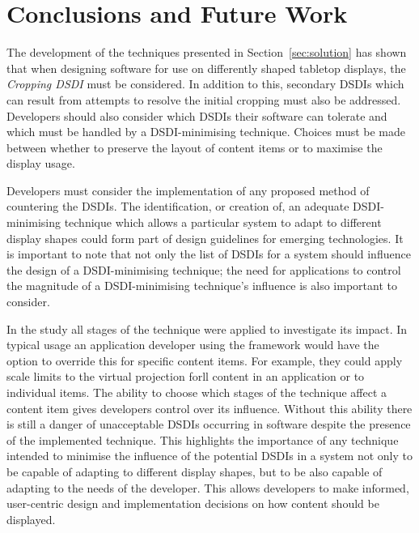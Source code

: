 \documentclass[twocolumn,compsoc]{cvm}
\begin{document}
{%


\section{Conclusions and Future Work}
\label{sec:conclusion}

The development of the techniques presented in Section~\ref{sec:solution} has shown that when designing software for use on differently shaped tabletop displays, the {\emph{Cropping \ac{DSDI}}} must be considered.
In addition to this, secondary \acp{DSDI} which can result from attempts to resolve the initial cropping must also be addressed.
Developers should also consider which \acp{DSDI} their software can tolerate and which must be handled by a \ac{DSDI}-minimising technique.
Choices must be made between whether to preserve the layout of content items or to maximise the display usage.

Developers must consider the implementation of any proposed method of countering the \acp{DSDI}.
The identification, or creation of, an adequate \ac{DSDI}-minimising technique which allows a particular system to adapt to different display shapes could form part of design guidelines for emerging technologies.
It is important to note that not only the list of \acp{DSDI} for a system should influence the design of a \ac{DSDI}-minimising technique; the need for applications to control the magnitude of a \ac{DSDI}-minimising technique's influence is also important to consider.

In the study all stages of the technique were applied to investigate its impact.
In typical usage an application developer using the framework would have the option to override this for specific content items.
For example, they could apply scale limits to the virtual projection forll content in an application or to individual items.
The ability to choose which stages of the technique affect a content item gives developers control over its influence.
Without this ability there is still a danger of unacceptable \acp{DSDI} occurring in software despite the presence of the implemented technique.
This highlights the importance of any technique intended to minimise the influence of the potential \acp{DSDI} in a system not only to be capable of adapting to different display shapes, but to be also capable of adapting to the needs of the developer. 
This allows developers to make informed, user-centric design and implementation decisions on how content should be displayed.

}
\end{document}
